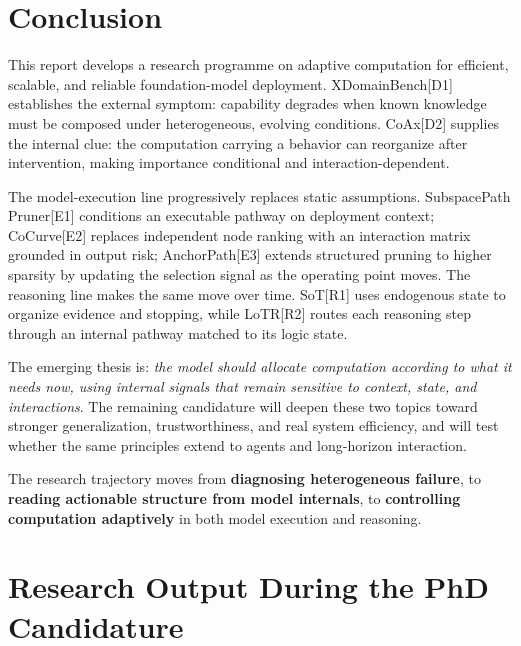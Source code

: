 \documentclass[12pt,a4paper]{article}
\newcommand{\method}[1]{{\sffamily\bfseries\color{MethodBlue}#1}}
\newcommand{\XDB}{\method{XDomainBench}}
\newcommand{\SubspacePath}{\method{SubspacePath Pruner}}
\newcommand{\CoCurve}{\method{CoCurve}}
\newcommand{\AnchorPath}{\method{AnchorPath}}
\newcommand{\CoAx}{\method{CoAx}}
\newcommand{\SoT}{\method{SoT}}
\newcommand{\LoTR}{\method{LoTR}}
\newcommand{\EtoE}{\method{E2E-Merge}}
\newcommand{\workref}[2]{\kern0.14em\hyperref[#2]{\textcolor{NTUred}{\textsf{\bfseries\scriptsize[#1]}}}}
\def\method#1{#1}\def\XDB{XDomainBench}\def\SubspacePath{SubspacePath Pruner}%
\def\CoCurve{CoCurve}\def\AnchorPath{AnchorPath}\def\CoAx{CoAx}%
\def\SoT{SoT}\def\LoTR{LoTR}\def\EtoE{E2E-Merge}%
\def\workref#1#2{[#1]}%
\begin{document}
\clearpage
\section{Conclusion}
\label{sec:conclusion}

This report develops a research programme on adaptive computation for efficient, scalable, and reliable foundation-model deployment. \XDB{}\workref{D1}{sec:xdb} establishes the external symptom: capability degrades when known knowledge must be composed under heterogeneous, evolving conditions. \CoAx{}\workref{D2}{sec:coax} supplies the internal clue: the computation carrying a behavior can reorganize after intervention, making importance conditional and interaction-dependent.

The model-execution line progressively replaces static assumptions. \SubspacePath{}\workref{E1}{sec:subspace} conditions an executable pathway on deployment context; \CoCurve{}\workref{E2}{sec:cocurve} replaces independent node ranking with an interaction matrix grounded in output risk; \AnchorPath{}\workref{E3}{sec:anchor} extends structured pruning to higher sparsity by updating the selection signal as the operating point moves. The reasoning line makes the same move over time. \SoT{}\workref{R1}{sec:sot} uses endogenous state to organize evidence and stopping, while \LoTR{}\workref{R2}{sec:lotr} routes each reasoning step through an internal pathway matched to its logic state.

The emerging thesis is: \emph{the model should allocate computation according to what it needs now, using internal signals that remain sensitive to context, state, and interactions}. The remaining candidature will deepen these two topics toward stronger generalization, trustworthiness, and real system efficiency, and will test whether the same principles extend to agents and long-horizon interaction.

\begin{insightbox}[QE takeaway]
The research trajectory moves from \textbf{diagnosing heterogeneous failure}, to \textbf{reading actionable structure from model internals}, to \textbf{controlling computation adaptively} in both model execution and reasoning.
\end{insightbox}

\clearpage
\section{Research Output During the PhD Candidature}
\label{sec:output}
\end{document}
